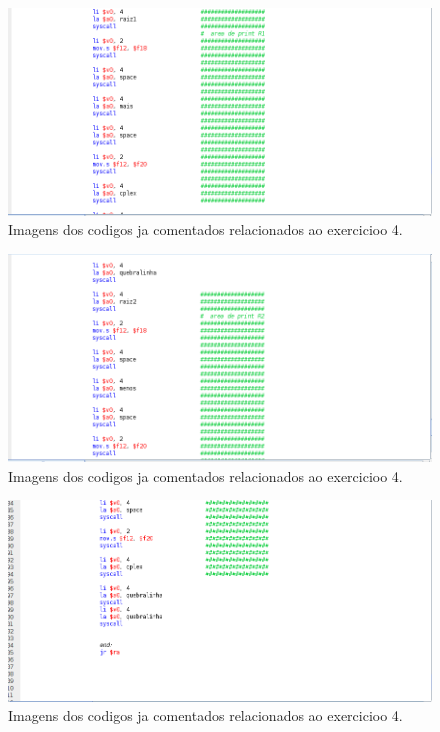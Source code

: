 \documentclass[12pt]{article}
\begin{document}
\begin{figure}[H]
	\centering
	\includegraphics[width=1\textwidth]{EX_4_10.png}
	\caption{Imagens dos codigos ja comentados relacionados ao exercicioo 4.}
	\label{fig:hilo}
\end{figure}

\begin{figure}[H] 
	\centering
	\includegraphics[width=1\textwidth]{EX_4_11.png}
	\caption{Imagens dos codigos ja comentados relacionados ao exercicioo 4.}
	\label{fig:hilo}
\end{figure}

\begin{figure}[H]
	\centering
	\includegraphics[width=1\textwidth]{EX_4_12.png}
	\caption{Imagens dos codigos ja comentados relacionados ao exercicioo 4.}
	\label{fig:hilo}
\end{figure}
\end{document}
